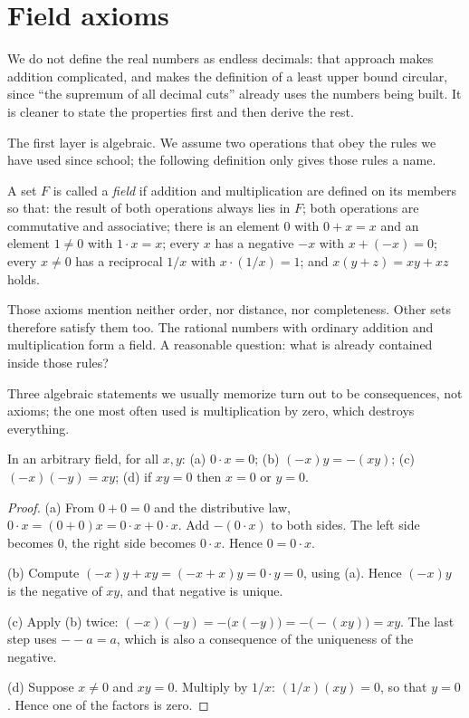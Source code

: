 \section{Field axioms}

We do not define the real numbers as endless decimals: that approach makes addition
complicated, and makes the definition of a least upper bound circular, since
``the supremum of all decimal cuts'' already uses the numbers being built. It is
cleaner to state the properties first and then derive the rest.

The first layer is algebraic. We assume two operations that obey the rules we have
used since school; the following definition only gives those rules a name.

\begin{definisi}[Field]
A set $F$ is called a \emph{field} if addition and multiplication are defined on its
members so that: the result of both operations always lies in $F$; both operations are
commutative and associative; there is an element $0$ with $0+x=x$ and an element
$1\neq 0$ with $1\cdot x=x$; every $x$ has a negative $-x$ with $x+(-x)=0$; every
$x\neq 0$ has a reciprocal $1/x$ with $x\cdot(1/x)=1$; and $x(y+z)=xy+xz$ holds.
\end{definisi}

Those axioms mention neither order, nor distance, nor completeness. Other sets
therefore satisfy them too. The rational numbers with ordinary addition and
multiplication form a field. A reasonable question: what is already contained inside
those rules?

Three algebraic statements we usually memorize turn out to be consequences, not
axioms; the one most often used is multiplication by zero, which destroys everything.

\begin{teorema}
In an arbitrary field, for all $x,y$: (a) $0\cdot x=0$;
(b) $(-x)y=-(xy)$; (c) $(-x)(-y)=xy$; (d) if $xy=0$ then $x=0$ or $y=0$.
\end{teorema}

\begin{proof}
(a) From $0+0=0$ and the distributive law, $0\cdot x=(0+0)x=0\cdot x+0\cdot x$.
Add $-(0\cdot x)$ to both sides. The left side becomes $0$, the right side becomes
$0\cdot x$. Hence $0=0\cdot x$.

(b) Compute $(-x)y+xy=(-x+x)y=0\cdot y=0$, using (a). Hence $(-x)y$ is the negative
of $xy$, and that negative is unique.

(c) Apply (b) twice: $(-x)(-y)=-\bigl(x(-y)\bigr)=-\bigl(-(xy)\bigr)=xy$.
The last step uses $--a=a$, which is also a consequence of the uniqueness of the
negative.

(d) Suppose $x\neq 0$ and $xy=0$. Multiply by $1/x$: $(1/x)(xy)=0$, so that
$y=0$. Hence one of the factors is zero.
\end{proof}

